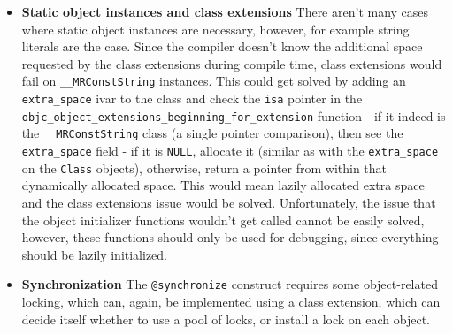 \begin{itemize}
  \item{\bf{Static object instances and class extensions}} There aren't many cases where static object instances are necessary, however, for example string literals are the case. Since the compiler doesn't know the additional space requested by the class extensions during compile time, class extensions would fail on \verb=__MRConstString= instances. This could get solved by adding an \verb=extra_space= ivar to the class and check the \verb=isa= pointer in the \newline{}\verb=objc_object_extensions_beginning_for_extension= function - if it indeed is the \verb=__MRConstString= class (a single pointer comparison), then see the \verb=extra_space= field - if it is \verb=NULL=, allocate it (similar as with the \verb=extra_space= on the \verb=Class= objects), otherwise, return a pointer from within that dynamically allocated space. This would mean lazily allocated extra space and the class extensions issue would be solved. Unfortunately, the issue that the object initializer functions wouldn't get called cannot be easily solved, however, these functions should only be used for debugging, since everything should be lazily initialized.
  \item{\bf{Synchronization}} The \verb=@synchronize= construct requires some object-related locking, which can, again, be implemented using a class extension, which can decide itself whether to use a pool of locks, or install a lock on each object.
\end{itemize}


